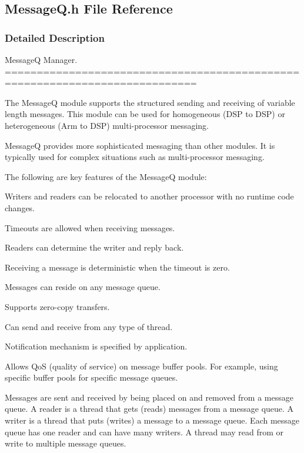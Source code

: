 \subsection{Message\-Q.\-h File Reference}
\label{_message_q_8h}


\subsubsection{Detailed Description}
Message\-Q Manager. ============================================================================

The Message\-Q module supports the structured sending and receiving of variable length messages. This module can be used for homogeneous (D\-S\-P to D\-S\-P) or heterogeneous (Arm to D\-S\-P) multi-\/processor messaging.

Message\-Q provides more sophisticated messaging than other modules. It is typically used for complex situations such as multi-\/processor messaging.

The following are key features of the Message\-Q module\-:
\begin{DoxyItemize}
\item Writers and readers can be relocated to another processor with no runtime code changes.
\item Timeouts are allowed when receiving messages.
\item Readers can determine the writer and reply back.
\item Receiving a message is deterministic when the timeout is zero.
\item Messages can reside on any message queue.
\item Supports zero-\/copy transfers.
\item Can send and receive from any type of thread.
\item Notification mechanism is specified by application.
\item Allows Qo\-S (quality of service) on message buffer pools. For example, using specific buffer pools for specific message queues.
\end{DoxyItemize}

Messages are sent and received by being placed on and removed from a message queue. A reader is a thread that gets (reads) messages from a message queue. A writer is a thread that puts (writes) a message to a message queue. Each message queue has one reader and can have many writers. A thread may read from or write to multiple message queues.

